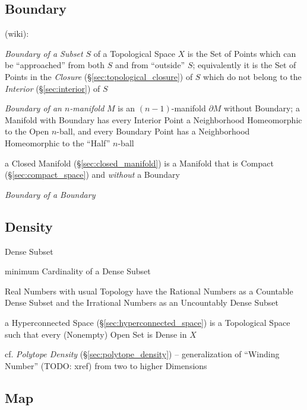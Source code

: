 \subsection{Boundary}\label{sec:boundary}

(wiki):

\emph{Boundary of a Subset} $S$ of a Topological Space $X$ is the Set of Points
which can be ``approached'' from both $S$ and from ``outside'' $S$; equivalently
it is the Set of Points in the \emph{Closure} (\S\ref{sec:topological_closure})
of $S$ which do not belong to the \emph{Interior} (\S\ref{sec:interior}) of $S$

\emph{Boundary of an $n$-manifold} $M$ is an $(n-1)$-manifold $\partial M$
without Boundary; a Manifold with Boundary has every Interior Point a
Neighborhood Homeomorphic to the Open $n$-ball, and every Boundary Point has a
Neighborhood Homeomorphic to the ``Half'' $n$-ball

\fist a Closed Manifold (\S\ref{sec:closed_manifold}) is a Manifold that is
Compact (\S\ref{sec:compact_space}) and \emph{without} a Boundary

\emph{Boundary of a Boundary}



\subsection{Density}\label{sec:density}

Dense Subset

minimum Cardinality of a Dense Subset

Real Numbers with usual Topology have the Rational Numbers as a Countable Dense
Subset and the Irrational Numbers as an Uncountably Dense Subset

\fist a Hyperconnected Space (\S\ref{sec:hyperconnected_space}) is a
Topological Space such that every (Nonempty) Open Set is Dense in $X$

\fist cf. \emph{Polytope Density} (\S\ref{sec:polytope_density}) --
generalization of ``Winding Number'' (TODO: xref) from two to higher Dimensions



\subsection{Map}\label{sec:topology_map}

